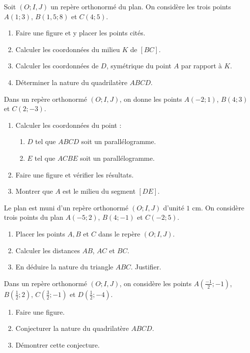 \documentclass[11pt]{article}
\begin{document}
\begin{exo}
Soit $(O; I, J)$ un repère orthonormé du plan. On
considère les trois points $A(1; 3)$, $B(1,5 ; 8)$ et $C(4; 5)$.
\begin{enumerate}
  \item Faire une figure et y placer les points cités.
  \item Calculer les coordonnées du milieu $K$ de $\left[ BC \right]$.
  \item Calculer les coordonnées de $D$, symétrique du point $A$ par rapport à
    $K$.
  \item Déterminer la nature du quadrilatère $ABCD$.
\end{enumerate}
\end{exo}

\begin{exo}
Dans un repère orthonormé $(O; I, J)$, on donne les
points $A(-2; 1)$, $B(4; 3)$ et $C(2; -3)$.
\begin{enumerate}
  \item Calculer les coordonnées du point :\begin{enumerate}
      \item $D$ tel que $ABCD$ soit un parallélogramme.
      \item $E$ tel que $ACBE$ soit un parallélogramme.
    \end{enumerate}
  \item Faire une figure et vérifier les résultats.
  \item Montrer que $A$ est le milieu du segment $\left[ DE \right]$.
\end{enumerate}
\end{exo}

\begin{exo}
Le plan est muni d'un repère orthonormé $(O; I, J)$
d'unité $1$ cm. On considère trois points du plan $A(-5; 2)$, $B(4; -1)$ et
$C(-2; 5)$.
\begin{enumerate}
  \item Placer les points $A, B$ et $C$ dans le repère $(O; I, J)$.
  \item Calculer les distances $AB$, $AC$ et $BC$.
  \item En déduire la nature du triangle $ABC$. Justifier.
\end{enumerate}
\end{exo}

\begin{exo}
Dans un repère orthonormé $(O; I, J)$, on considère les
points $A(\frac{-1}{2}; -1)$, $B(\frac{1}{2}; 2)$, $C(\frac{3}{2}; -1)$ et
$D(\frac{1}{2}; -4)$.
\begin{enumerate}
  \item Faire une figure.
  \item Conjecturer la nature du quadrilatère $ABCD$.
  \item Démontrer cette conjecture.
\end{enumerate}
\end{exo}
\end{document}
